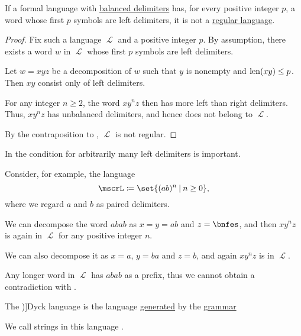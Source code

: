 \begin{proposition}\label{thm:paired_delimiters_not_regular}
  If a formal language with  \hyperref[def:paired_delimiters]{balanced delimiters} has, for every positive integer \( p \), a word whose first \( p \) symbols are left delimiters, it is not a \hyperref[def:chomsky_hierarchy/regular]{regular language}.
\end{proposition}
\begin{proof}
  Fix such a language \( \mscrL \) and a positive integer \( p \). By assumption, there exists a word \( w \) in \( \mscrL \) whose first \( p \) symbols are left delimiters.

  Let \( w = x y z \) be a decomposition of \( w \) such that \( y \) is nonempty and \( \operatorname{len}(xy) \leq p \). Then \( xy \) consist only of left delimiters.

  For any integer \( n \geq 2 \), the word \( x y^n z \) then has more left than right delimiters. Thus, \( x y^n z \) has unbalanced delimiters, and hence does not belong to \( \mscrL \).

  By the contraposition to , \( \mscrL \) is not regular.
\end{proof}

\begin{example}\label{ex:thm:paired_delimiters_not_regular}
  In  the condition for arbitrarily many left delimiters is important.

  Consider, for example, the language
  \begin{equation*}
    \mscrL \coloneqq \set{ (ab)^n \given n \geq 0 },
  \end{equation*}
  where we regard \( a \) and \( b \) as paired delimiters.

  We can decompose the word \( abab \) as \( x = y = ab \) and \( z = \bnfes \), and then \( xy^n z \) is again in \( \mscrL \) for any positive integer \( n \).

  We can also decompose it as \( x = a \), \( y = ba \) and \( z = b \), and again \( xy^n z \) is in \( \mscrL \).

  Any longer word in \( \mscrL \) has \( abab \) as a prefix, thus we cannot obtain a contradiction with .
\end{example}

\begin{definition}\label{def:dyck_language}
  The \term[ru=язык Дика (\cite[213]{Гладкий1973Языки})]{Dyck language} is the language \hyperref[def:formal_grammar/language]{generated} by the \hyperref[def:formal_grammar]{grammar}
  \begin{bnf*}
     {\bnftsq{(} \bnfsp {} \bnfsp \bnftsq{)} \bnfor {} \bnfsp {} \bnfor \varepsilon}
  \end{bnf*}

  We call strings in this language .
\end{definition}

